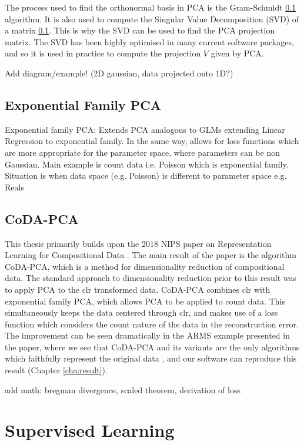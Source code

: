 The process used to find the orthonormal basis in PCA is the Gram-Schmidt \ref{} algorithm. It is also used to compute the Singular Value Decomposition (SVD) of a matrix \ref{}. This is why the SVD can be used to find the PCA projection matrix. The SVD has been highly optimised in many current software packages, and so it is used in practice to compute the projection $V$ given by PCA.  

Add diagram/example! (2D gaussian, data projected onto 1D?)


\subsection{Exponential Family PCA}
Exponential family PCA: Extends PCA analogous to GLMs extending Linear Regression to exponential family. In the same way, allows for loss functions which are more appropriate for the parameter space, where parameters can be non Gaussian. Main example is count data i.e. Poisson which is exponential family. Situation is when data space (e.g. Poisson) is different to parameter space e.g. Reals

\subsection{CoDA-PCA}
\label{codapca}
This thesis primarily builds upon the 2018 NIPS paper on Representation Learning for Compositional Data \citep{Avalos2018}. The main result of the paper is the algorithm CoDA-PCA, which is a method for dimensionality reduction of compositional data. The standard approach to dimensionality reduction prior to this result was to apply PCA to the clr transformed data. CoDA-PCA combines clr with exponential family PCA, which allows PCA to be applied to count data. This simultaneously keeps the data centered through clr, and makes use of a loss function which considers the count nature of the data in the reconstruction error. The improvement can be seen dramatically in the ARMS example presented in the paper, where we see that CoDA-PCA and its variants are the only algorithms which faithfully represent the original data \citep{Avalos2018}, and our software can reproduce this result (Chapter \ref{cha:result}).     

add math: bregman divergence, scaled theorem, derivation of loss


\section{Supervised Learning}
\label{sec:sup}


